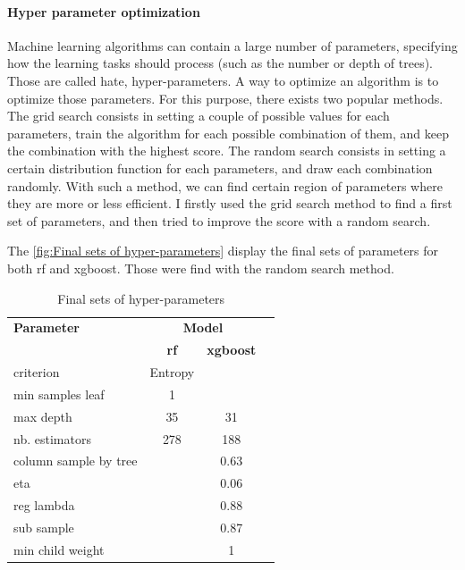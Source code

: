 \documentclass[12pt]{article}
\begin{document}
\paragraph{Hyper parameter optimization}
Machine learning algorithms can contain a large number of parameters, specifying how the learning tasks should process (such as the number or depth of trees). Those are called hate, hyper-parameters. A way to optimize an algorithm is to optimize those parameters. For this purpose, there exists two popular methods. 
The grid search consists in setting a couple of possible values for each parameters, train the algorithm for each possible combination of them, and keep the combination with the highest score.
The random search consists in setting a certain distribution function for each parameters, and draw each combination randomly. With such a method, we can find certain region of parameters where they are more or less efficient. \hfill \break
I firstly used the grid search method to find a first set of parameters, and then tried to improve the score with a random search.\hfill \break

The \autoref{fig:Final sets of hyper-parameters} display the final sets of parameters for both \acrshort{rf} and \acrshort{xgboost}. Those were find with the random search method.

\FloatBarrier
\begin{table}[h!]
    \centering
    \caption{Final sets of hyper-parameters}

    \begin{tabular}{lccc}
        \toprule
        \textbf{Parameter} & \multicolumn{2}{c}{\textbf{Model}} \\
        \cmidrule{2-3}
         & \textbf{\acrshort{rf}} & \textbf{\acrshort{xgboost}} \\
        \midrule
        criterion & Entropy &  \\
        min samples leaf & 1 &  \\
        max depth & 35 & 31 \\
        nb. estimators & 278 & 188 \\
        column sample by tree & & 0.63  \\
        eta & & 0.06  \\
        reg lambda & &0.88 \\
        sub sample && 0.87\\
        min child weight && 1\\
        \bottomrule
    \end{tabular}
    \label{fig:Final sets of hyper-parameters}
\end{table}
\FloatBarrier
\end{document}

